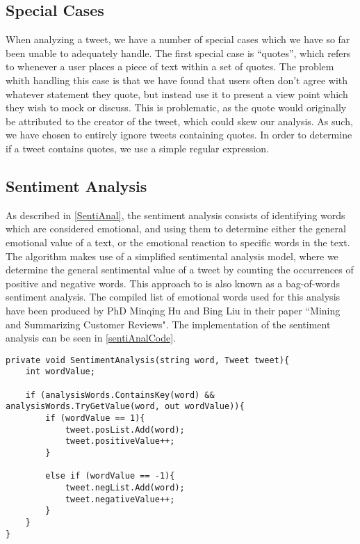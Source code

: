 \subsection{Special Cases}\label{AlgorithmCases}
When analyzing a tweet, we have a number of special cases which we have so far
been unable to adequately handle. The first special case is ``quotes'', which refers
to whenever a user places a piece of text within a set of quotes. The problem
whith handling this case is that we have found that users often don't agree
with whatever statement they quote, but instead use it to present a view point
which they wish to mock or discuss. This is problematic, as the quote would
originally be attributed to the creator of the tweet, which could skew our
analysis. As such, we have chosen to entirely ignore tweets containing quotes.
In order to determine if a tweet contains quotes, we use a simple regular
expression.

\subsection{Sentiment Analysis}
As described in \autoref{SentiAnal}, the sentiment analysis consists of
identifying words which are considered emotional, and using them to determine
either the general emotional value of a text, or the emotional reaction to
specific words in the text. The algorithm makes use of a simplified sentimental
analysis model, where we determine the general sentimental value of a tweet by
counting the occurrences of positive and negative words. This approach to is
also known as a bag-of-words sentiment analysis\citep{BagOfWords}. The
compiled list of emotional words used for this analysis have been produced by
PhD Minqing Hu and Bing Liu in their paper ``Mining and Summarizing Customer
Reviews"\citep{Hu:2004:MSC:1014052.1014073}. The implementation of the sentiment
analysis can be seen in \autoref{sentiAnalCode}.\\

\begin{minipage}[H]{\linewidth}
\begin{lstlisting}[caption = Determining the sentiment of a tweet , label = sentiAnalCode] 
private void SentimentAnalysis(string word, Tweet tweet){
	int wordValue;

    if (analysisWords.ContainsKey(word) && analysisWords.TryGetValue(word, out wordValue)){
    	if (wordValue == 1){
        	tweet.posList.Add(word);
            tweet.positiveValue++;
        }

        else if (wordValue == -1){
        	tweet.negList.Add(word);
            tweet.negativeValue++;
        }
    }
}
\end{lstlisting}
\end{minipage}

